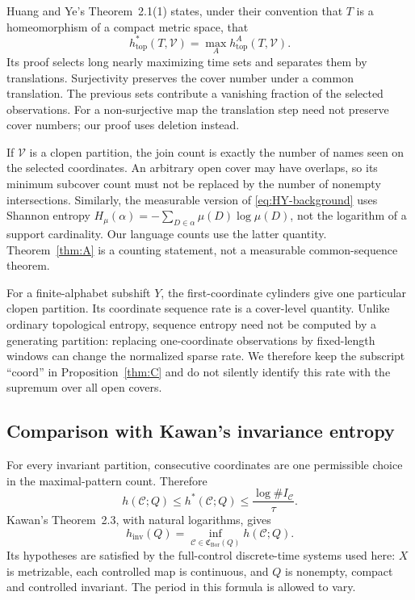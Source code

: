 \documentclass[11pt,reqno]{amsart}
\numberwithin{equation}{section}
\theoremstyle{definition}
\theoremstyle{definition}
\newcommand{\C}{\mathcal C}
\newcommand{\hpat}{h^{*}}
\newcommand{\hinv}{h_{\mathrm{inv}}}
\newcommand{\Bor}{\mathrm{Bor}}
\begin{document}
Huang and Ye's Theorem~2.1(1) states, under their convention that $T$ is a
homeomorphism of a compact metric space, that
\begin{equation}\label{eq:HY-background}
 h_{\mathrm{top}}^*(T,\mathcal V)
 =\max_A h_{\mathrm{top}}^A(T,\mathcal V).
\end{equation}
Its proof selects long nearly maximizing time sets and separates them
by translations. Surjectivity preserves the cover number under a common
translation. The previous sets contribute a vanishing fraction of the
selected observations. For a non-surjective map the translation step
need not preserve cover numbers; our proof uses deletion instead.

If $\mathcal V$ is a clopen partition, the join count is exactly the
number of names seen on the selected coordinates. An arbitrary open
cover may have overlaps, so its minimum subcover count must not be
replaced by the number of nonempty intersections. Similarly, the
measurable version of \eqref{eq:HY-background} uses Shannon entropy
$H_\mu(\alpha)=-\sum_{D\in\alpha}\mu(D)\log\mu(D)$, not the logarithm
of a support cardinality. Our language counts use the latter quantity.
Theorem~\ref{thm:A} is a counting statement, not a measurable
common-sequence theorem.

For a finite-alphabet subshift $Y$, the first-coordinate cylinders give
one particular clopen partition. Its coordinate sequence rate is a
cover-level quantity. Unlike ordinary topological entropy, sequence
entropy need not be computed by a generating partition: replacing
one-coordinate observations by fixed-length windows can change the
normalized sparse rate. We therefore keep the subscript
``$\mathrm{coord}$'' in Proposition~\ref{thm:C} and do not silently
identify this rate with the supremum over all open covers.

\subsection{Comparison with Kawan's invariance entropy}
For every invariant partition, consecutive coordinates are one permissible
choice in the maximal-pattern count. Therefore
\begin{equation}\label{eq:ordinary-pattern-one-sided}
 h(\C;Q)\le\hpat(\C;Q)\le\frac{\log\#I_\C}{\tau}.
\end{equation}
Kawan's Theorem~2.3, with natural logarithms, gives
\begin{equation}\label{eq:kawan-characterization}
 \hinv(Q)=\inf_{\C\in\mathfrak C_{\Bor}(Q)}h(\C;Q).
\end{equation}
Its hypotheses are satisfied by the full-control discrete-time systems
used here: $X$ is metrizable, each controlled map is continuous, and
$Q$ is nonempty, compact and controlled invariant.
The period in this formula is allowed to vary.
\end{document}
